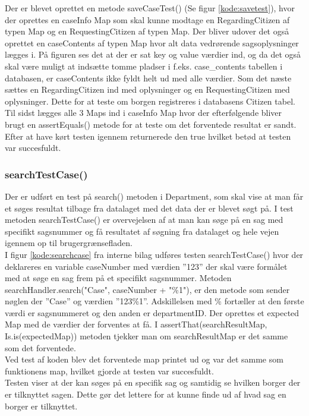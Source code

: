 Der er blevet oprettet en metode saveCaseTest() (Se figur \ref{kode:savetest}), hvor der oprettes en caseInfo Map som skal kunne modtage en RegardingCitizen af typen Map og en RequestingCitizen af typen Map. Der bliver udover det også oprettet en caseContents af typen Map hvor alt data vedrørende sagsoplysninger lægges i. På figuren ses det at der er sat key og value værdier ind, og da det også skal være muligt at indsætte tomme pladser i f.eks. case\_contents tabellen i databasen, er caseContents ikke fyldt helt ud med alle værdier. Som det næste sættes en RegardingCitizen ind med oplysninger og en RequestingCitizen med oplysninger. Dette for at teste om borgen registreres i databasens Citizen tabel. Til sidst lægges alle 3 Maps ind i caseInfo Map hvor der efterfølgende bliver brugt en assertEquals() metode for at teste om det forventede resultat er sandt. \\
Efter at have kørt testen igennem returnerede den true hvilket betød at testen var succesfuldt. \\
\subsubsection{searchTestCase()}
Der er udført en test på search() metoden i Department, som skal vise at man får et søges resultat tilbage fra datalaget med det data der er blevet søgt på. I test metoden searchTestCase() er overvejelsen af at man kan søge på en sag med specifikt sagsnummer og få resultatet af søgning fra datalaget og hele vejen igennem op til brugergrænsefladen. \\
I figur \ref{kode:searchcase} fra interne bilag udføres testen searchTestCase() hvor der deklareres en variable caseNumber med værdien ”123” der skal være formålet med at søge en sag frem på et specifikt sagsnummer. Metoden searchHandler.search("Case", caseNumber + "\%1"), er den metode som sender nøglen der ”Case” og værdien ”123\%1”. Adskillelsen med \% fortæller at den første værdi er sagsnummeret og den anden er departmentID. Der oprettes et expected Map med de værdier der forventes at få. I assertThat(searchResultMap, Is.is(expectedMap)) metoden tjekker man om searchResultMap er det samme som det forventede.\\
Ved test af koden blev det forventede map printet ud og var det samme som funktionens map, hvilket gjorde at testen var succesfuldt. \\
Testen viser at der kan søges på en specifik sag og samtidig se hvilken borger der er tilknyttet sagen. Dette gør det lettere for at kunne finde ud af hvad sag en borger er tilknyttet.  \\

